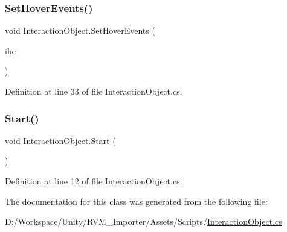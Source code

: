 \subsubsection{\texorpdfstring{SetHoverEvents()}{SetHoverEvents()}}
{\footnotesize\ttfamily void Interaction\+Object.\+Set\+Hover\+Events (\begin{DoxyParamCaption}\item[{Valve.\+V\+R.\+Interaction\+System.\+Interactable\+Hover\+Events}]{ihe }\end{DoxyParamCaption})}



Definition at line 33 of file Interaction\+Object.\+cs.

\mbox{\label{class_interaction_object_a7c7fcc433d4f42a854e8f73a8811bb61}} 
\subsubsection{\texorpdfstring{Start()}{Start()}}
{\footnotesize\ttfamily void Interaction\+Object.\+Start (\begin{DoxyParamCaption}{ }\end{DoxyParamCaption})}



Definition at line 12 of file Interaction\+Object.\+cs.



The documentation for this class was generated from the following file\+:\begin{DoxyCompactItemize}
\item 
D\+:/\+Workspace/\+Unity/\+R\+V\+M\+\_\+\+Importer/\+Assets/\+Scripts/\mbox{\hyperlink{_interaction_object_8cs}{Interaction\+Object.\+cs}}\end{DoxyCompactItemize}
